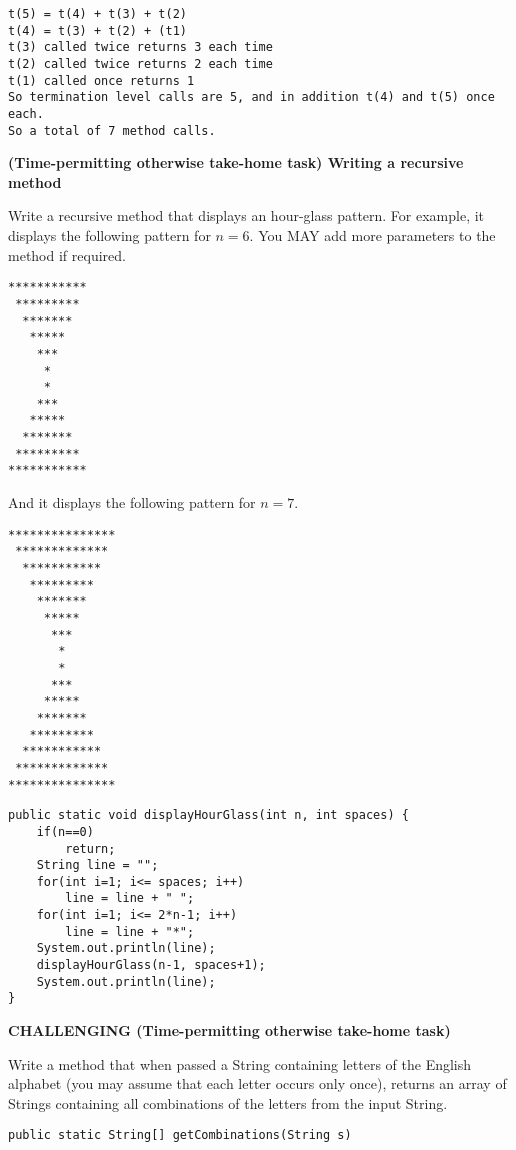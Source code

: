 \begin{questions}
\begin{solution}
\begin{verbatim}
t(5) = t(4) + t(3) + t(2)
t(4) = t(3) + t(2) + (t1)
t(3) called twice returns 3 each time
t(2) called twice returns 2 each time
t(1) called once returns 1
So termination level calls are 5, and in addition t(4) and t(5) once each. 
So a total of 7 method calls.
\end{verbatim}
\end{solution}

\newpage
		
\question  \textbf{(Time-permitting otherwise take-home task) Writing a recursive method} \vskip 0.5cm

Write a recursive method that displays an hour-glass pattern. For example, it displays the following pattern for $n = 6$. You MAY add more parameters to the method if required.

\begin{verbatim}
***********
 *********
  *******
   *****
    ***
     *
     *
    ***
   *****
  *******
 *********
***********
\end{verbatim}

And it displays the following pattern for $n = 7$.

\begin{verbatim}
***************
 *************
  ***********
   *********
    *******
     *****	
      ***
       *
       *
      ***
     *****
    *******
   *********
  ***********
 *************
***************
\end{verbatim}

\ifprintanswers
\begin{lstlisting}
public static void displayHourGlass(int n, int spaces) {
	if(n==0)
		return;
	String line = "";
	for(int i=1; i<= spaces; i++)
		line = line + " ";
	for(int i=1; i<= 2*n-1; i++)
		line = line + "*";
	System.out.println(line);
	displayHourGlass(n-1, spaces+1);
	System.out.println(line);
}
\end{lstlisting}
\else
\fi

\question \textbf{CHALLENGING (Time-permitting otherwise take-home task)} \vskip 0.5cm

Write a method that when passed a String containing letters of the English alphabet (you may assume that each letter occurs only once), returns an array of Strings containing all combinations of the letters from the input String.

\begin{lstlisting}
public static String[] getCombinations(String s)
\end{lstlisting} 


\end{questions}
